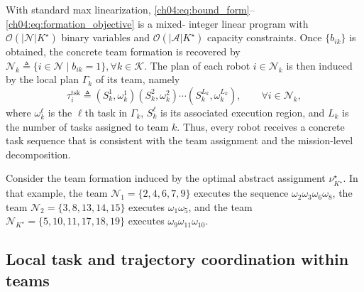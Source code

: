 With standard max linearization,
\eqref{ch04:eq:bound_form}--\eqref{ch04:eq:formation_objective} is a mixed-
integer linear program with $\mathcal{O}(|\mathcal{N}|K^\star)$ binary variables
and $\mathcal{O}(|\mathcal{A}|K^\star)$ capacity constraints.  Once $\{b_{ik}\}$ is obtained, the
concrete team formation is recovered by
$\mathcal{N}_k \triangleq
\{i\in\mathcal{N}\mid b_{ik}=1\},
\forall k\in\mathcal{K}$.
The plan of each robot $i\in\mathcal{N}_k$ is then induced by the local plan
$\Gamma_k$ of its team, namely
\begin{equation}
\label{ch04:eq:robot-plan}
\tau_i^{\mathrm{tsk}} \triangleq
(S_k^1,\omega_k^1)(S_k^2,\omega_k^2)\cdots(S_k^{L_k},\omega_k^{L_k}),
\qquad \forall i\in\mathcal{N}_k,
\end{equation}
where $\omega_k^\ell$ is the $\ell$th task in $\Gamma_k$, $S_k^\ell$ is its
associated execution region, and $L_k$ is the number of tasks assigned to team
$k$. Thus, every robot receives a concrete task sequence that is consistent
with the team assignment and the mission-level decomposition.

\begin{example}
\label{ch04:example:formation}
Consider the team formation induced by the
optimal abstract assignment $\nu_{K^\star}^\star$. In that example, the team
$\mathcal{N}_1=\{2,4,6,7,9\}$ executes the sequence
$\omega_2\omega_3\omega_6\omega_8$, the team
$\mathcal{N}_2=\{3,8,13,14,15\}$ executes $\omega_1\omega_5$, and the team
$\mathcal{N}_{K^\star}=\{5,10,11,17,18,19\}$ executes
$\omega_9\omega_{11}\omega_{10}$.
\end{example}




















\subsection{Local task and trajectory coordination within teams}
\label{ch04:subsec:local_coordination}

